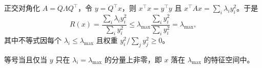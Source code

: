 \documentclass[aspectratio=169,10pt]{beamer}
\begin{document}
\begin{frame}{}
   正交对角化 $A=Q\Lambda Q^\top$，令 $y=Q^\top x$，则 $x^\top x=y^\top y$ 且
  $x^\top A x=\sum_i\lambda_i y_i^2$。于是
  \[ R(x)=\frac{\sum_i\lambda_i y_i^2}{\sum_i y_i^2}\le\lambda_{\max}\frac{\sum_i y_i^2}{\sum_i y_i^2}=\lambda_{\max}, \]
  其中不等式因每个 $\lambda_i\le\lambda_{\max}$ 且权重 $y_i^2/\sum_j y_j^2\ge0$。\par\smallskip
   等号当且仅当 $y$ 只在 $\lambda_i=\lambda_{\max}$ 的分量上非零，即 $x$ 落在
  $\lambda_{\max}$ 的特征空间中。\TLqed
\end{frame}
\end{document}
